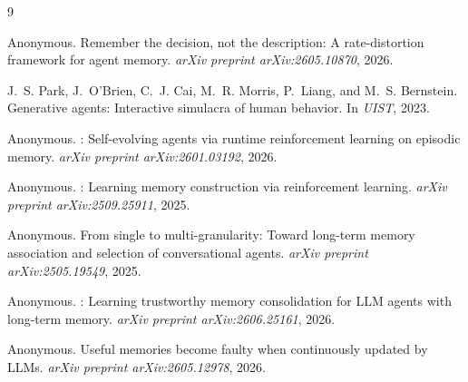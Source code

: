 \documentclass{article}
\begin{document}
\begin{thebibliography}{9}

Anonymous.
\newblock Remember the decision, not the description: A
rate-distortion framework for agent memory.
\newblock \emph{arXiv preprint arXiv:2605.10870}, 2026.

J.~S. Park, J.~O'Brien, C.~J. Cai, M.~R. Morris, P.~Liang, and
M.~S. Bernstein.
\newblock Generative agents: Interactive simulacra of human behavior.
\newblock In \emph{UIST}, 2023.

Anonymous.
: Self-evolving agents via runtime reinforcement
learning on episodic memory.
\newblock \emph{arXiv preprint arXiv:2601.03192}, 2026.

Anonymous.
: Learning memory construction via
reinforcement learning.
\newblock \emph{arXiv preprint arXiv:2509.25911}, 2025.

Anonymous.
\newblock From single to multi-granularity: Toward long-term memory
association and selection of conversational agents.
\newblock \emph{arXiv preprint arXiv:2505.19549}, 2025.

Anonymous.
: Learning trustworthy memory consolidation for
{LLM} agents with long-term memory.
\newblock \emph{arXiv preprint arXiv:2606.25161}, 2026.

Anonymous.
\newblock Useful memories become faulty when continuously updated by
{LLMs}.
\newblock \emph{arXiv preprint arXiv:2605.12978}, 2026.

\end{thebibliography}

\appendix
\end{document}
